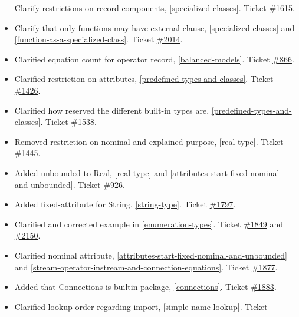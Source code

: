 \begin{itemize}
  Clarify restrictions on record components, \autoref{specialized-classes}. Ticket
  \href{https://github.com/modelica/ModelicaSpecification/issues/1615}{\#1615}.
\item
  Clarify that only functions may have external clause, \autoref{specialized-classes} and
  \autoref{function-as-a-specialized-class}. Ticket
  \href{https://github.com/modelica/ModelicaSpecification/issues/2014}{\#2014}.
\item
  Clarified equation count for operator record, \autoref{balanced-models}. Ticket
  \href{https://github.com/modelica/ModelicaSpecification/issues/866}{\#866}.
\item
  Clarified restriction on attributes, \autoref{predefined-types-and-classes}. Ticket
  \href{https://github.com/modelica/ModelicaSpecification/issues/1426}{\#1426}.
\item
  Clarified how reserved the different built-in types are, \autoref{predefined-types-and-classes}.
  Ticket \href{https://github.com/modelica/ModelicaSpecification/issues/1538}{\#1538}.
\item
  Removed restriction on nominal and explained purpose, \autoref{real-type}.
  Ticket \href{https://github.com/modelica/ModelicaSpecification/issues/1445}{\#1445}.
\item
  Added unbounded to Real, \autoref{real-type} and \autoref{attributes-start-fixed-nominal-and-unbounded}. Ticket
  \href{https://github.com/modelica/ModelicaSpecification/issues/926}{\#926}.
\item
  Added fixed-attribute for String, \autoref{string-type}. Ticket
  \href{https://github.com/modelica/ModelicaSpecification/issues/1797}{\#1797}.
\item
  Clarified and corrected example in \autoref{enumeration-types}. Ticket
  \href{https://github.com/modelica/ModelicaSpecification/issues/1849}{\#1849} and
  \href{https://github.com/modelica/ModelicaSpecification/issues/2150}{\#2150}.
\item
  Clarified nominal attribute, \autoref{attributes-start-fixed-nominal-and-unbounded}
  and \autoref{stream-operator-instream-and-connection-equations}. Ticket
  \href{https://github.com/modelica/ModelicaSpecification/issues/1877}{\#1877}.
\item
  Added that Connections is builtin package, \autoref{connections}. Ticket
  \href{https://github.com/modelica/ModelicaSpecification/issues/1883}{\#1883}.
\item
  Clarified lookup-order regarding import, \autoref{simple-name-lookup}. Ticket

\end{itemize}
